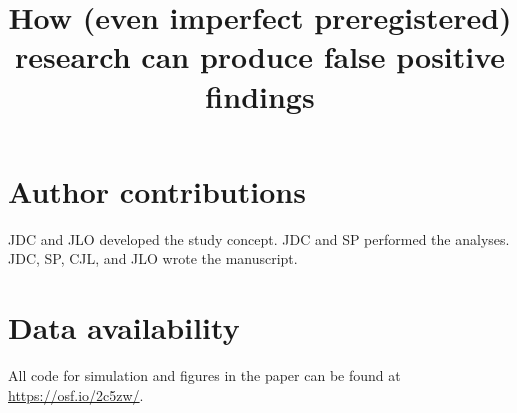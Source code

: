 \documentclass[english,natbib,man,floatsintext]{apa6}
\title{How (even imperfect preregistered) research can produce false positive findings}
\begin{document}
\maketitle









\section{Author contributions}
JDC and JLO developed the study concept. JDC and SP performed the analyses. JDC, SP, CJL, and JLO wrote the manuscript. 

\section{Data availability}
All code for simulation and figures in the paper can be found at \url{https://osf.io/2c5zw/}.



\clearpage

 
 
 
\end{document}

